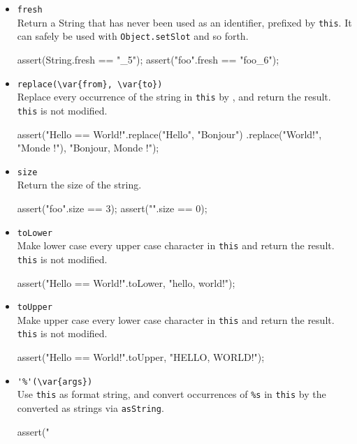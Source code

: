 \begin{itemize}
\item \lstinline|fresh|\\
  Return a String that has never been used as an identifier, prefixed
  by \lstinline|this|.  It can safely be used with
  \lstinline|Object.setSlot| and so forth.
\begin{urbiscript}[firstnumber=last]
assert(String.fresh == "_5");
assert("foo".fresh == "foo_6");
\end{urbiscript}

\item \lstinline|replace(\var{from}, \var{to})|\\
  Replace every occurrence of the string  in
  \lstinline|this| by , and return the result.
  \lstinline|this| is not modified.
\begin{urbiscript}[firstnumber=last]
assert("Hello == World!".replace("Hello", "Bonjour")
                      .replace("World!", "Monde !"),
       "Bonjour, Monde !");
\end{urbiscript}

\item \lstinline|size|\\
  Return the size of the string.
\begin{urbiscript}[firstnumber=last]
assert("foo".size == 3);
assert("".size == 0);
\end{urbiscript}

\item \lstinline|toLower|\\
  Make lower case every upper case character in \lstinline|this| and
  return the result.  \lstinline|this| is not modified.
\begin{urbiscript}[firstnumber=last]
assert("Hello == World!".toLower, "hello, world!");
\end{urbiscript}

\item \lstinline|toUpper|\\
  Make upper case every lower case character in \lstinline|this| and
  return the result.  \lstinline|this| is not modified.
\begin{urbiscript}[firstnumber=last]
assert("Hello == World!".toUpper, "HELLO, WORLD!");
\end{urbiscript}

\item \lstinline|'%'(\var{args})|\\
  Use \lstinline|this| as format string, and convert occurrences of
  \lstinline|%s| in \lstinline|this| by the  converted as
  strings via \lstinline|asString|.
\begin{urbiscript}[firstnumber=last]
assert("%
\end{urbiscript}


\end{itemize}
